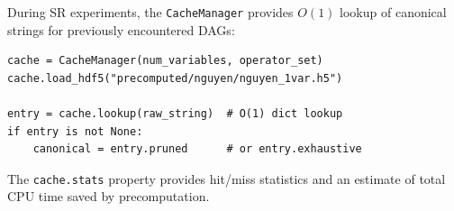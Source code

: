 During SR experiments, the \texttt{CacheManager} provides $O(1)$ lookup
of canonical strings for previously encountered DAGs:

\begin{verbatim}
cache = CacheManager(num_variables, operator_set)
cache.load_hdf5("precomputed/nguyen/nguyen_1var.h5")

entry = cache.lookup(raw_string)  # O(1) dict lookup
if entry is not None:
    canonical = entry.pruned      # or entry.exhaustive
\end{verbatim}

The \texttt{cache.stats} property provides hit/miss statistics and an
estimate of total CPU time saved by precomputation.
